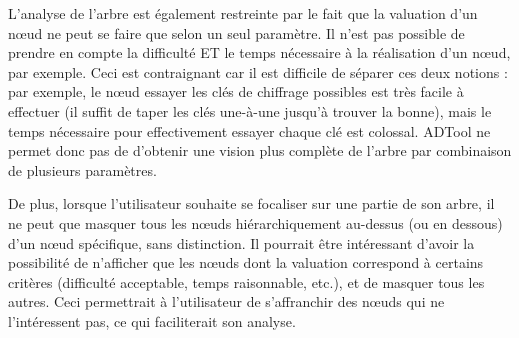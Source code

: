 	L'analyse de l'arbre est également restreinte par le fait que la valuation d'un nœud ne peut se faire que selon un seul paramètre. Il n'est pas possible de prendre en compte la \og difficulté \fg{} ET le \og temps nécessaire \fg{} à la réalisation d'un nœud, par exemple. Ceci est contraignant car il est difficile de séparer ces deux notions : par exemple, le nœud \og essayer les clés de chiffrage possibles \fg{} est très facile à effectuer (il suffit de taper les clés une-à-une jusqu'à trouver la bonne), mais le temps nécessaire pour effectivement essayer chaque clé est colossal. ADTool ne permet donc pas de d'obtenir une vision plus complète de l'arbre par combinaison de plusieurs paramètres.
	
	 De plus, lorsque l'utilisateur souhaite se focaliser sur une partie de son arbre, il ne peut que masquer tous les nœuds hiérarchiquement au-dessus (ou en dessous) d'un nœud spécifique, sans distinction. Il pourrait être intéressant d'avoir la possibilité de n'afficher que les nœuds dont la valuation correspond à certains critères (difficulté acceptable, temps raisonnable, etc.), et de masquer tous les autres. Ceci permettrait à l'utilisateur de s'affranchir des nœuds qui ne l'intéressent pas, ce qui faciliterait son analyse.
	 
	 
	 

